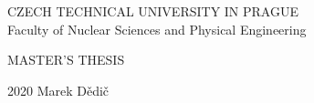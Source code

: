 

\geometry{tmargin=3.2cm,bmargin=4.5cm,lmargin=2.75cm,rmargin=3.25cm,headheight=0.8cm,headsep=1cm,footskip=0.5cm,marginparwidth=1.6cm}



\pagestyle{empty}

\begin{center}
	\uppercase{\LARGE Czech Technical University in Prague} \\
	\huge Faculty of Nuclear Sciences and Physical Engineering

	\vfill

	\uppercase{\Huge Master's thesis}
\end{center}

\vspace{2.5cm}
\vfill

\LARGE 2020 \hfill Marek Dědič


